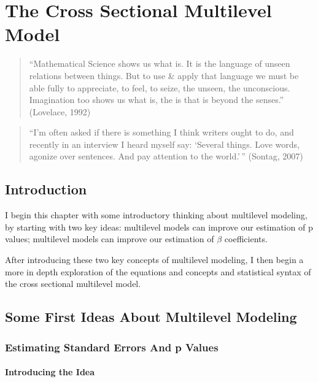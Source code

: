 \documentclass[
  letterpaper,
  DIV=11,
  numbers=noendperiod]{scrreprt}
\begin{document}

\chapter{The Cross Sectional Multilevel
Model}\label{the-cross-sectional-multilevel-model}

\begin{quote}
``Mathematical Science shows us what is. It is the language of unseen
relations between things. But to use \& apply that language we must be
able fully to appreciate, to feel, to seize, the unseen, the
unconscious. Imagination too shows us what is, the is that is beyond the
senses.'' (Lovelace, 1992)
\end{quote}

\begin{quote}
``I'm often asked if there is something I think writers ought to do, and
recently in an interview I heard myself say: `Several things. Love
words, agonize over sentences. And pay attention to the world.'\,''
(Sontag, 2007)
\end{quote}

\section{Introduction}\label{introduction-1}

I begin this chapter with some introductory thinking about multilevel
modeling, by starting with two key ideas: multilevel models can improve
our estimation of p values; multilevel models can improve our estimation
of \(\beta\) coefficients. 

After introducing these two key concepts of multilevel modeling, I then
begin a more in depth exploration of the equations and concepts and
statistical syntax of the cross sectional multilevel model.

\section{Some First Ideas About Multilevel
Modeling}\label{some-first-ideas-about-multilevel-modeling}

\subsection{Estimating Standard Errors And p Values}\label{sec-pvalues}

\subsubsection{Introducing the Idea}\label{introducing-the-idea}
\end{document}
